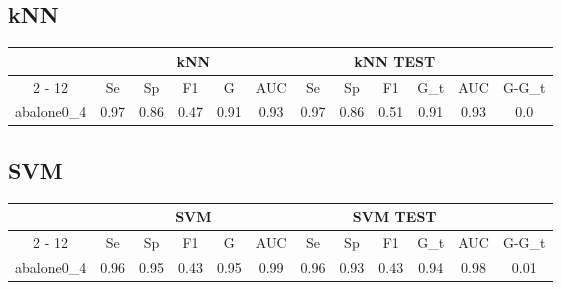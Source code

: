 \documentclass{article}%
\begin{document}
%
\subsection*{kNN}%
\begin{tabular}{|c|c|c|c|c|c|c|c|c|c|c|c|}%
\hline%
&\multicolumn{5}{|c|}{kNN}&\multicolumn{5}{|c|}{kNN TEST}&\\%
\cline{2%
-%
12}%
&Se&Sp&F1&G&AUC&Se&Sp&F1&G\_t&AUC&G{-}G\_t\\%
\hline%
abalone0\_4&0.97&0.86&0.47&0.91&0.93&0.97&0.86&0.51&0.91&0.93&0.0\\%
\hline%
\end{tabular}

%
\subsection*{SVM}%
\begin{tabular}{|c|c|c|c|c|c|c|c|c|c|c|c|}%
\hline%
&\multicolumn{5}{|c|}{SVM}&\multicolumn{5}{|c|}{SVM TEST}&\\%
\cline{2%
-%
12}%
&Se&Sp&F1&G&AUC&Se&Sp&F1&G\_t&AUC&G{-}G\_t\\%
\hline%
abalone0\_4&0.96&0.95&0.43&0.95&0.99&0.96&0.93&0.43&0.94&0.98&0.01\\%
\hline%
\end{tabular}

%
\end{document}
